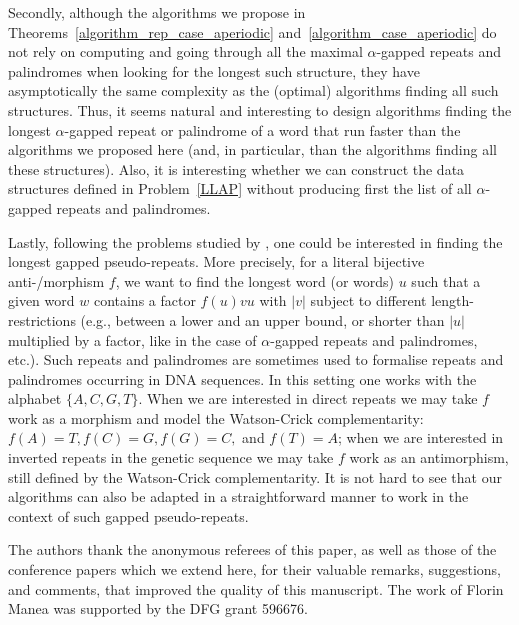 \documentclass[final]{dmtcs-episciences}
\begin{document}
Secondly, although the algorithms we propose in Theorems~\ref{algorithm_rep_case_aperiodic} and~\ref{algorithm_case_aperiodic} do not rely on computing and going through all the maximal $\alpha$-gapped repeats and palindromes when looking for the longest such structure, they have asymptotically the same complexity as the (optimal) algorithms finding all such structures. Thus, it seems natural and interesting to design algorithms finding the longest $\alpha$-gapped repeat or palindrome of a word that run faster than the algorithms we proposed here (and, in particular, than the algorithms finding all these structures). Also, it is interesting whether we can construct the data structures defined in Problem~\ref{LLAP} without producing first the list of all $\alpha$-gapped repeats and palindromes. 

Lastly, following the problems studied by \cite{GMMNT13,GMN14}, one could be interested in finding the longest gapped pseudo-repeats. More precisely, for a literal bijective anti-/morphism $f$, we want to find the longest word (or words) $u$ such that a given word $w$ contains a factor $f(u)vu$ with $|v|$ subject to different length-restrictions (e.g., between a lower and an upper bound, or shorter than $|u|$ multiplied by a factor, like in the case of $\alpha$-gapped repeats and palindromes, etc.). Such repeats and palindromes are sometimes used to formalise repeats and palindromes occurring in DNA sequences. In this setting one works with the alphabet $\{A,C,G,T\}$. When we are interested in direct repeats we may take $f$ work as a morphism and model the Watson-Crick complementarity: $f(A)=T, f(C)=G, f(G)=C,$ and $f(T)=A$;  when we are interested in inverted repeats in the genetic sequence we may take $f$ work as an antimorphism, still defined by the Watson-Crick complementarity. It is not hard to see that our algorithms can also be adapted in a straightforward manner to work in the context of such gapped pseudo-repeats.


\acknowledgements
The authors thank the anonymous referees of this paper, as well as those of the conference papers which we extend here, for their valuable remarks, suggestions, and comments, that improved the quality of this manuscript. The work of Florin Manea was supported by the DFG grant 596676.


\nocite{*}


\label{sec:biblio}
\end{document}
